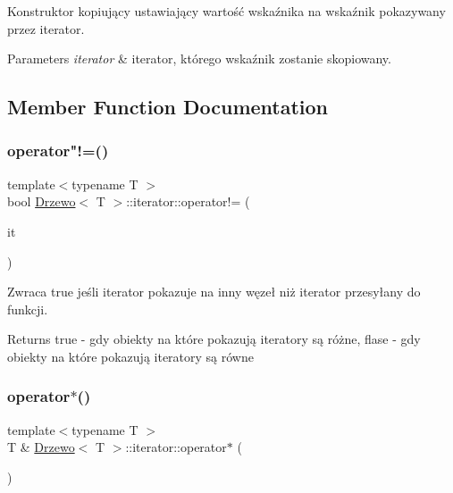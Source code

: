 Konstruktor kopiujący ustawiający wartość wskaźnika na wskaźnik pokazywany przez iterator.


\begin{DoxyParams}{Parameters}
{\em iterator} & iterator, którego wskaźnik zostanie skopiowany. \\
\hline
\end{DoxyParams}


\subsection{Member Function Documentation}
\mbox{\label{class_drzewo_1_1iterator_a7bc726d05d85b2d7b2cd68f180237331}} 
\subsubsection{\texorpdfstring{operator"!=()}{operator!=()}}
{\footnotesize\ttfamily template$<$typename T $>$ \\
bool \hyperlink{class_drzewo}{Drzewo}$<$ T $>$\+::iterator\+::operator!= (\begin{DoxyParamCaption}\item[{const \hyperlink{class_drzewo_1_1iterator}{iterator} \&}]{it }\end{DoxyParamCaption})\hspace{0.3cm}{\ttfamily [inline]}}

Zwraca \textquotesingle{}true\textquotesingle{} jeśli iterator pokazuje na inny węzeł niż iterator przesyłany do funkcji.

\begin{DoxyReturn}{Returns}
true -\/ gdy obiekty na które pokazują iteratory są różne, flase -\/ gdy obiekty na które pokazują iteratory są równe 
\end{DoxyReturn}
\mbox{\label{class_drzewo_1_1iterator_ab2ee76d0390832e9bed32a829f08f328}} 
\subsubsection{\texorpdfstring{operator$\ast$()}{operator*()}}
{\footnotesize\ttfamily template$<$typename T $>$ \\
T \& \hyperlink{class_drzewo}{Drzewo}$<$ T $>$\+::iterator\+::operator$\ast$ (\begin{DoxyParamCaption}{ }\end{DoxyParamCaption})\hspace{0.3cm}{\ttfamily [inline]}}

